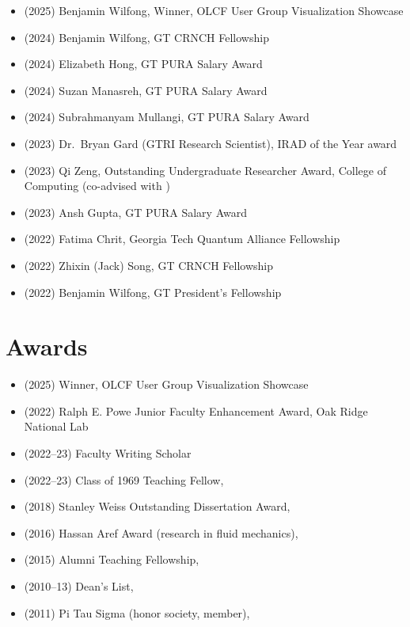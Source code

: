\begin{itemize}
    \item (2025) Benjamin Wilfong, Winner, OLCF User Group Visualization Showcase
    \item (2024) Benjamin Wilfong, GT CRNCH Fellowship
    \item (2024) Elizabeth Hong, GT PURA Salary Award
    \item (2024) Suzan Manasreh, GT PURA Salary Award
    \item (2024) Subrahmanyam Mullangi, GT PURA Salary Award
    \item (2023) Dr.\ Bryan Gard (GTRI Research Scientist), IRAD of the Year award
    \item (2023) Qi Zeng, Outstanding Undergraduate Researcher Award, College of Computing (co-advised with \Florian)
    \item (2023) Ansh Gupta, GT PURA Salary Award
    \item (2022) Fatima Chrit, Georgia Tech Quantum Alliance Fellowship
    \item (2022) Zhixin (Jack) Song, GT CRNCH Fellowship
    \item (2022) Benjamin Wilfong, GT President's Fellowship
\end{itemize}

\section{Awards}

\begin{itemize}
    \item (2025) Winner, OLCF User Group Visualization Showcase
    \item (2022) Ralph E. Powe Junior Faculty Enhancement Award, Oak Ridge National Lab
    \item (2022--23) \GT Faculty Writing Scholar
    \item (2022--23) Class of 1969 Teaching Fellow, \GIT
    \item (2018) Stanley Weiss Outstanding Dissertation Award, \UIUC
    \item (2016) Hassan Aref Award (research in fluid mechanics), \UIUC
    \item (2015) Alumni Teaching Fellowship, \UIUC
    \item (2010--13) Dean's List, \UMD
    \item (2011) Pi Tau Sigma (honor society, member), \UMD
\end{itemize}

